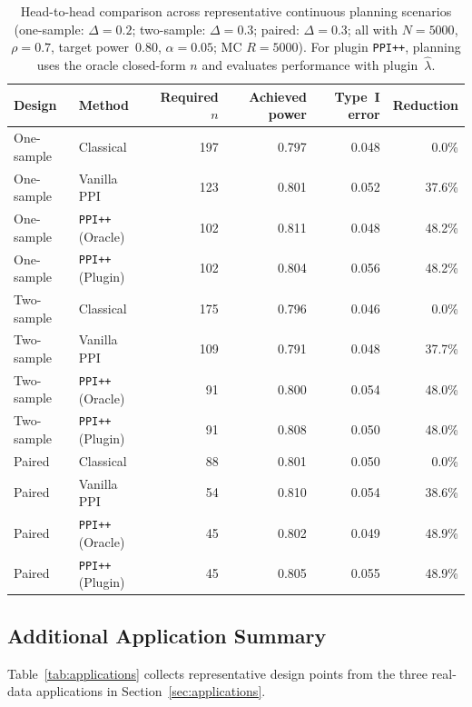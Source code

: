 \begin{table}[!ht]
\centering
\caption{Head-to-head comparison across representative continuous
  planning scenarios (one-sample: $\Delta = 0.2$; two-sample:
  $\Delta = 0.3$; paired: $\Delta = 0.3$; all with $N = 5000$,
  $\rho = 0.7$, target power~$0.80$, $\alpha = 0.05$;
  MC $R = 5000$).  For plugin \texttt{PPI++}, planning uses the oracle
  closed-form $n$ and evaluates performance with
  plugin~$\hat\lambda$.}
\label{tab:head-to-head-multidesign}
\small
\begin{tabular}{llrrrr}
\toprule
Design & Method & Required $n$ & Achieved power & Type~I error
  & Reduction \\
\midrule
One-sample & Classical & 197 & 0.797 & 0.048 & 0.0\% \\
One-sample & Vanilla PPI & 123 & 0.801 & 0.052 & 37.6\% \\
One-sample & \texttt{PPI++} (Oracle) & 102 & 0.811 & 0.048 & 48.2\% \\
One-sample & \texttt{PPI++} (Plugin) & 102 & 0.804 & 0.056 & 48.2\% \\
Two-sample & Classical & 175 & 0.796 & 0.046 & 0.0\% \\
Two-sample & Vanilla PPI & 109 & 0.791 & 0.048 & 37.7\% \\
Two-sample & \texttt{PPI++} (Oracle) & 91 & 0.800 & 0.054 & 48.0\% \\
Two-sample & \texttt{PPI++} (Plugin) & 91 & 0.808 & 0.050 & 48.0\% \\
Paired & Classical & 88 & 0.801 & 0.050 & 0.0\% \\
Paired & Vanilla PPI & 54 & 0.810 & 0.054 & 38.6\% \\
Paired & \texttt{PPI++} (Oracle) & 45 & 0.802 & 0.049 & 48.9\% \\
Paired & \texttt{PPI++} (Plugin) & 45 & 0.805 & 0.055 & 48.9\% \\
\bottomrule
\end{tabular}
\end{table}

\subsection{Additional Application Summary}
\label{sec:appendix-application-summary}

Table~\ref{tab:applications} collects representative design points from
the three real-data applications in Section~\ref{sec:applications}.

